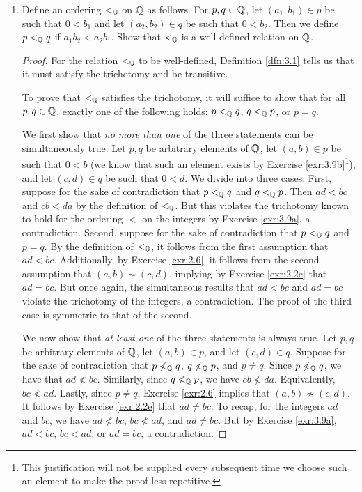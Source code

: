 \documentclass[../main.tex]{subfiles}
\begin{document}
\begin{exercise}
\begin{enumerate}[label={\alph*)},ref={\thetheorem\alph*}]
\begin{proof}
        \end{proof}
        \item \label{exr:3.9c}Define an ordering $<_{\mathbb{Q}}$ on $\mathbb{Q}$ as follows. For $p,q\in\mathbb{Q}$, let $(a_1,b_1)\in p$ be such that $0<b_1$ and let $(a_2,b_2)\in q$ be such that $0<b_2$. Then we define $p<_{\mathbb{Q}} q$ if $a_1b_2<a_2b_1$. Show that $<_{\mathbb{Q}}$ is a well-defined relation on $\mathbb{Q}$.
        \begin{proof}
            For the relation $<_{\mathbb{Q}}$ to be well-defined, Definition \ref{dfn:3.1} tells us that it must satisfy the trichotomy and be transitive.\par\smallskip
            To prove that $<_{\mathbb{Q}}$ satisfies the trichotomy, it will suffice to show that for all $p,q\in\mathbb{Q}$, exactly one of the following holds: $p<_{\mathbb{Q}} q$, $q<_{\mathbb{Q}} p$, or $p=q$.\par
            We first show that \emph{no more than one} of the three statements can be simultaneously true. Let $p,q$ be arbitrary elements of $\mathbb{Q}$, let $(a,b)\in p$ be such that $0<b$ (we know that such an element exists by Exercise \ref{exr:3.9b}\footnote{This justification will not be supplied every subsequent time we choose such an element to make the proof less repetitive.}), and let $(c,d)\in q$ be such that $0<d$. We divide into three cases. First, suppose for the sake of contradiction that $p<_{\mathbb{Q}} q$ and $q<_{\mathbb{Q}} p$. Then $ad<bc$ and $cb<da$ by the definition of $<_{\mathbb{Q}}$. But this violates the trichotomy known to hold for the ordering $<$ on the integers by Exercise \ref{exr:3.9a}, a contradiction. Second, suppose for the sake of contradiction that $p<_{\mathbb{Q}} q$ and $p=q$. By the definition of $<_{\mathbb{Q}}$, it follows from the first assumption that $ad<bc$. Additionally, by Exercise \ref{exr:2.6}, it follows from the second assumption that $(a,b)\sim(c,d)$, implying by Exercise \ref{exr:2.2e} that $ad=bc$. But once again, the simultaneous results that $ad<bc$ and $ad=bc$ violate the trichotomy of the integers, a contradiction. The proof of the third case is symmetric to that of the second.\par
            We now show that \emph{at least one} of the three statements is always true. Let $p,q$ be arbitrary elements of $\mathbb{Q}$, let $(a,b)\in p$, and let $(c,d)\in q$. Suppose for the sake of contradiction that $p\not<_{\mathbb{Q}} q$, $q\not<_{\mathbb{Q}} p$, and $p\neq q$. Since $p\not<_{\mathbb{Q}} q$, we have that $ad\not<bc$. Similarly, since $q\not<_{\mathbb{Q}} p$, we have $cb\not<da$. Equivalently, $bc\not<ad$. Lastly, since $p\neq q$, Exercise \ref{exr:2.6} implies that $(a,b)\nsim(c,d)$. It follows by Exercise \ref{exr:2.2e} that $ad\neq bc$. To recap, for the integers $ad$ and $bc$, we have $ad\not<bc$, $bc\not<ad$, and $ad\neq bc$. But by Exercise \ref{exr:3.9a}, $ad<bc$, $bc<ad$, or $ad=bc$, a contradiction.\par\smallskip

\end{proof}
\end{enumerate}
\end{exercise}
\end{document}
